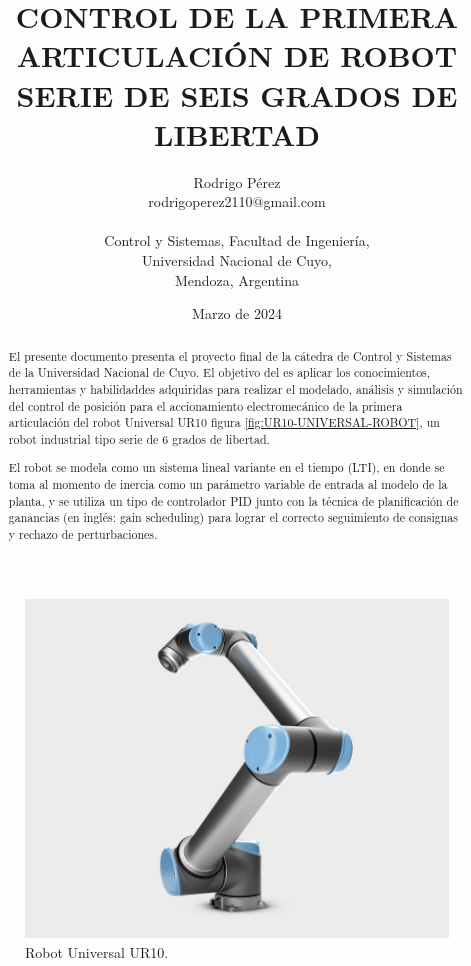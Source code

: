 \documentclass{article}
\title{\textbf{CONTROL DE LA PRIMERA ARTICULACIÓN DE ROBOT SERIE DE SEIS GRADOS DE LIBERTAD}}
\author{Rodrigo Pérez \\ rodrigoperez2110@gmail.com \\ \\ Control y Sistemas, Facultad de Ingeniería, \\ Universidad Nacional de Cuyo, \\ Mendoza, Argentina}
\date{Marzo de 2024}
\begin{document}
\begin{sloppypar}

\renewcommand{\tablename}{Tabla}

\maketitle


\begin{figure}[H]
    \centering
    \includegraphics[width=1\textwidth]{UR10-UNIVERSAL-ROBOT}
    \caption{Robot Universal UR10.}
    \label{fig:UR10-UNIVERSAL-ROBOT}
\end{figure}


\begin{abstract}
    El presente documento presenta el proyecto final de la cátedra de Control y Sistemas de la Universidad Nacional de Cuyo.
    El objetivo del es aplicar los conocimientos, herramientas y habilidaddes adquiridas para realizar el modelado, análisis y simulación del control de posición para el accionamiento electromecánico de la primera articulación del robot Universal UR10 figura \ref{fig:UR10-UNIVERSAL-ROBOT}, un robot industrial tipo serie de 6 grados de libertad.

    El robot se modela como un sistema lineal variante en el tiempo (LTI), en donde se toma al momento de inercia como un parámetro variable de entrada al modelo de la planta, y se utiliza un tipo de controlador PID junto con la técnica de planificación de ganancias (en inglés: gain scheduling) para lograr el correcto seguimiento de consignas y rechazo de perturbaciones.


\end{abstract}
\end{sloppypar}
\end{document}
